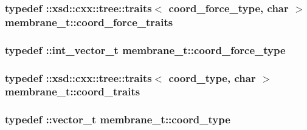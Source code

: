 \subsubsection[{\texorpdfstring{coord\+\_\+force\+\_\+traits}{coord_force_traits}}]{\setlength{\rightskip}{0pt plus 5cm}typedef \+::xsd\+::cxx\+::tree\+::traits$<$ {\bf coord\+\_\+force\+\_\+type}, char $>$ {\bf membrane\+\_\+t\+::coord\+\_\+force\+\_\+traits}}\hypertarget{classmembrane__t_a5edce7be5d85743cf318cbc01750134e}{}\label{classmembrane__t_a5edce7be5d85743cf318cbc01750134e}
\subsubsection[{\texorpdfstring{coord\+\_\+force\+\_\+type}{coord_force_type}}]{\setlength{\rightskip}{0pt plus 5cm}typedef \+::{\bf int\+\_\+vector\+\_\+t} {\bf membrane\+\_\+t\+::coord\+\_\+force\+\_\+type}}\hypertarget{classmembrane__t_a8866c2084ca9b88e98340080008777e5}{}\label{classmembrane__t_a8866c2084ca9b88e98340080008777e5}
\subsubsection[{\texorpdfstring{coord\+\_\+traits}{coord_traits}}]{\setlength{\rightskip}{0pt plus 5cm}typedef \+::xsd\+::cxx\+::tree\+::traits$<$ {\bf coord\+\_\+type}, char $>$ {\bf membrane\+\_\+t\+::coord\+\_\+traits}}\hypertarget{classmembrane__t_ad5ae6696a73759a2dacbed6d33371fbf}{}\label{classmembrane__t_ad5ae6696a73759a2dacbed6d33371fbf}
\subsubsection[{\texorpdfstring{coord\+\_\+type}{coord_type}}]{\setlength{\rightskip}{0pt plus 5cm}typedef \+::{\bf vector\+\_\+t} {\bf membrane\+\_\+t\+::coord\+\_\+type}}\hypertarget{classmembrane__t_a0841f5bafc269d612a4b6fefcce1d73f}{}\label{classmembrane__t_a0841f5bafc269d612a4b6fefcce1d73f}
